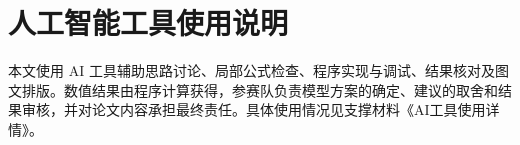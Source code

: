 \section{人工智能工具使用说明}
本文使用 AI 工具辅助思路讨论、局部公式检查、程序实现与调试、结果核对及图文排版。数值结果由程序计算获得，参赛队负责模型方案的确定、建议的取舍和结果审核，并对论文内容承担最终责任。具体使用情况见支撑材料《AI工具使用详情》。
